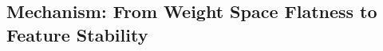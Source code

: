 \documentclass[10pt]{article} %
\begin{document}



\subsection{Mechanism: From Weight Space Flatness to Feature Stability}

\end{document}
